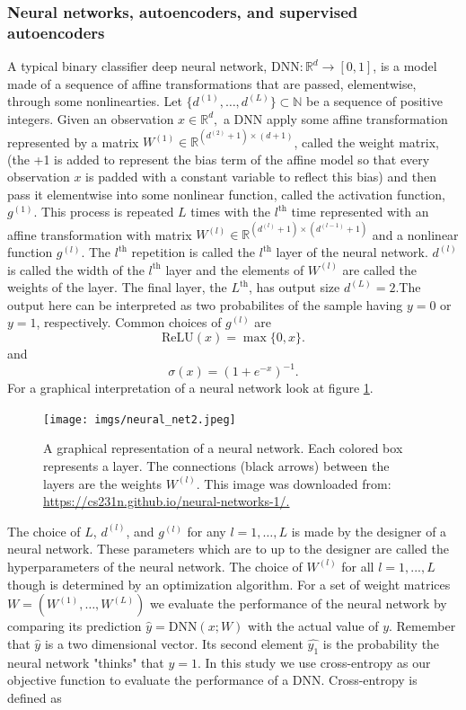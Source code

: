 \documentclass{article}
\begin{document}
\subsubsection{Neural networks, autoencoders, and supervised autoencoders}
A typical binary classifier deep neural network, $\mathrm{DNN}:\mathbb{R}^d \longrightarrow [0, 1]$, is a model made of a sequence of affine transformations that are passed, elementwise, through some nonlinearties. Let $\{d^{(1)},\dots,d^{(L)}\}\subset \mathbb N$ be a sequence of positive integers. Given an observation $x \in \mathbb R^d,$ a DNN apply some affine transformation represented by a matrix $W^{(1)} \in \mathbb R ^ {(d^{(2)} + 1) \times (d+1)}$, called the weight matrix, (the +1 is added to represent the bias term of the affine model so that every observation $x$ is padded with a constant variable to reflect this bias) and then pass it elementwise into some nonlinear function, called the activation function, $g^{(1)}$. This process is repeated $L$ times with the $l^{\text{th}}$ time represented with an affine transformation with matrix $W^{(l)} \in \mathbb{R}^{(d^{(l)} + 1) \times (d^{(l-1)} + 1)}$ and a nonlinear function $g^{(l)}.$ The $l^{\text{th}}$ repetition is called the $l^{\text{th}}$ layer of the neural network. $d^{(l)}$ is called the width of the $l^{\text{th}}$ layer and the elements of $W^{(l)}$ are called the weights of the layer. The final layer, the $L^{\text{th}}$, has output size $d^{(L)}=2$.The output here can be interpreted as two probabilites of the sample having $y=0$ or $y=1$, respectively. Common choices of $g^{(l)}$ are 
\[
\mathrm{ReLU}(x) = \max\{0, x\}.    
\]
and 
\[
    \sigma(x) = (1+e^{-x})^{-1}.
\]
For a graphical interpretation of a neural network look at figure \ref{fig:nn}.
\begin{figure}[t]
    \centering
    \texttt{[image: imgs/neural\_net2.jpeg]}
    \caption{A graphical representation of a neural network. Each colored box represents a layer. The connections (black arrows) between the layers are the weights $W^{(l)}.$ This image was downloaded from: \url{https://cs231n.github.io/neural-networks-1/.}}
    \label{fig:nn}
\end{figure}
The choice of $L$, $d^{(l)}$, and $g^{(l)}$ for any $l=1,\dots,L$ is made by the designer of a neural network. These parameters which are to up to the designer are called the hyperparameters of the neural network. The choice of $W^{(l)}$ for all $l = 1,...,L$ though is determined by an optimization algorithm. For a set of weight matrices $W=(W^{(1)},\dots,W^{(L)})$ we evaluate the performance of the neural network by comparing its prediction $\hat{y} = \mathrm{DNN}(x;W)$ with the actual value of $y.$ Remember that $\hat{y}$ is a two dimensional vector. Its second element $\hat{y_1}$ is the probability the neural network "thinks" that $y=1.$ In this study we use cross-entropy \cite{dlbook} as our objective function to evaluate the performance of a DNN. Cross-entropy is defined as 
\end{document}
